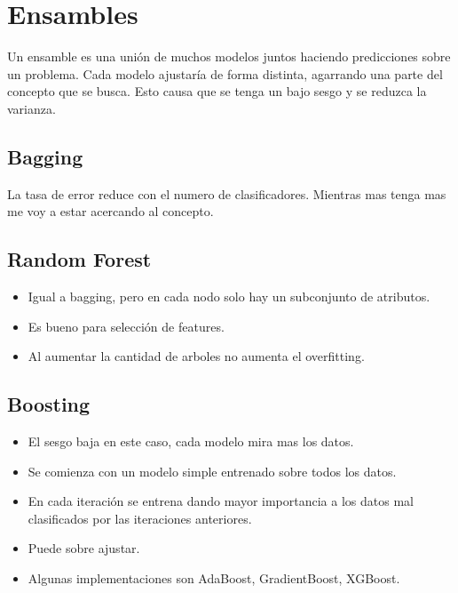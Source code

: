 \documentclass[titlepage,a4paper]{article}
\begin{document}
\section{Ensambles}

Un ensamble es una unión de muchos modelos juntos haciendo predicciones sobre un problema. Cada modelo ajustaría de forma distinta, agarrando una parte del concepto que se busca. Esto causa que se tenga un bajo sesgo y se reduzca la varianza.


\subsection{Bagging}


La tasa de error reduce con el numero de clasificadores. Mientras mas tenga mas me voy a estar acercando al concepto.

\subsection{Random Forest}

\begin{itemize}
    \item Igual a bagging, pero en cada nodo solo hay un subconjunto de atributos.
    \item Es bueno para selección de features.
    \item Al aumentar la cantidad de arboles no aumenta el overfitting.
\end{itemize}


\subsection{Boosting}
\begin{itemize}
    \item El sesgo baja en este caso, cada modelo mira mas los datos.
    \item Se comienza con un modelo simple entrenado sobre todos los datos.
    \item En cada iteración se entrena dando mayor importancia a los datos mal clasificados por las iteraciones anteriores.
    \item Puede sobre ajustar.
    \item Algunas implementaciones son AdaBoost, GradientBoost, XGBoost.
\end{itemize}
\end{document}
